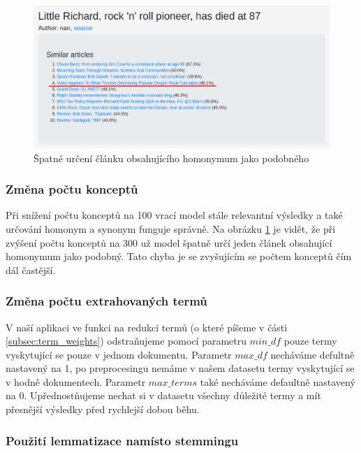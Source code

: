 \documentclass[11pt]{scrartcl} %
\begin{document}
\begin{figure}[h] %
	\centering
	\includegraphics[width=1\columnwidth]{images/homonym_bad.png}
	\caption{Špatné určení článku obsahujícího homonymum jako podobného}
	\label{fig:homonym_bad}
\end{figure}

\subsubsection{Změna počtu konceptů}
Při snížení počtu konceptů na 100 vrací model stále relevantní výsledky a také určování homonym a synonym funguje správně. Na obrázku \ref{fig:homonym_bad} je vidět, že při zvýšení počtu konceptů na 300 už model špatně určí jeden článek obsahující homonymum jako podobný. Tato chyba je se zvyšujícím se počtem konceptů čím dál častější.

\subsubsection{Změna počtu extrahovaných termů}

V naší aplikaci ve funkci na redukci termů (o které píšeme v části \ref{subsec:term_weights}) odstraňujeme pomocí parametru $\mathit{min\_df}$ pouze termy vyskytující se pouze v jednom dokumentu. Parametr $\mathit{max\_df}$ necháváme defultně nastavený na 1, po preprocesingu nemáme v našem datasetu termy vyskytující se v hodně dokumentech. Parametr $\mathit{max\_terms}$ také necháváme defaultně nastavený na 0. Upřednostňujeme nechat si v datasetu všechny důležité termy a mít přesnější výsledky před rychlejší dobou běhu.

\subsubsection{Použití lemmatizace namísto stemmingu}
\end{document}
